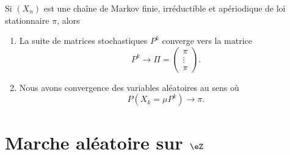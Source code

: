 \begin{theorem}     \label{ThoQSuLZoz}
    Si \( (X_n)\) est une chaîne de Markov finie, irréductible et apériodique de loi stationnaire \( \pi\), alors
    \begin{enumerate}
        \item
            La suite de matrices stochastiques \( P^k\) converge vers la matrice
            \begin{equation}
                P^k\to\Pi=\begin{pmatrix}
                    \pi    \\ 
                    \vdots    \\ 
                    \pi    
                \end{pmatrix}.
            \end{equation}
        \item
            Nous avons convergence des variables aléatoires au sens où
            \begin{equation}
                P(X_k=\mu P^k)\to \pi.
            \end{equation}
    \end{enumerate}
\end{theorem}

\section{Marche aléatoire sur \texorpdfstring{$\eZ$}{\( \eZ\)}}


